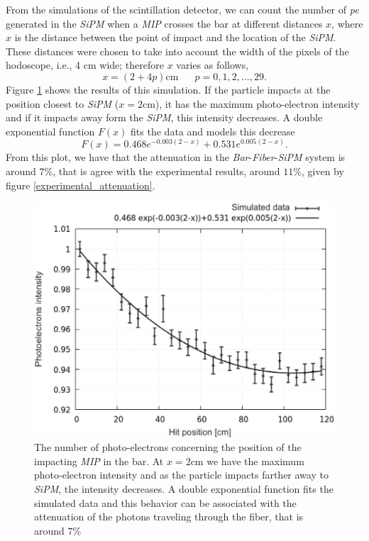 \documentclass[submitting]{nst}
\begin{document}
From the simulations of the scintillation detector, we can count the number of \textsl{pe} generated in the \textsl{SiPM} when a \textsl{MIP} crosses the bar at different distances $x$, where $x$ is the distance between the point of impact and the location of the \textsl{SiPM}. These distances were chosen to take into account the width of the pixels of the hodoscope, i.e., 4 cm wide; therefore $x$ varies as follows,
\begin{equation}
    x = (2+4p)\text{cm} \,\,\,\,\,\,\,\,\,\, p=0,1,2,...,29.
\end{equation}
Figure \ref{atenuacion_barra} shows the results of this simulation. If the particle impacts at the position closest to \textsl{SiPM} ($x=2$cm), it has the maximum photo-electron intensity and if it impacts  away form the \textsl{SiPM}, this intensity decreases. A double exponential function $F(x)$ fits the data and models this decrease
\begin{equation}
F(x)= \text{0.468}e^{-0.003(2-x)} + \text{0.531}e^{0.005(2-x)}.
\end{equation}
From this plot, we have that the attenuation in the \textsl{Bar}-\textsl{Fiber}-\textsl{SiPM} system is around $7$\%, that is agree with the experimental results, around $11\%$, given by figure \ref{experimental_attenuation}.
\begin{figure}[h!]
    \centering
        \includegraphics[scale=0.41]{Figures/atenuacion_barra_2.png}
   \caption{The number of photo-electrons concerning the position of the impacting \textsl{MIP} in the bar.    At $x=2$cm we have the maximum photo-electron intensity and as the particle impacts farther away to \textsl{SiPM}, the intensity decreases. A double exponential function fits the simulated data and this behavior can be associated with the attenuation of the photons traveling through the fiber, that is around $7$\%}
   \label{atenuacion_barra}
\end{figure}
\end{document}
